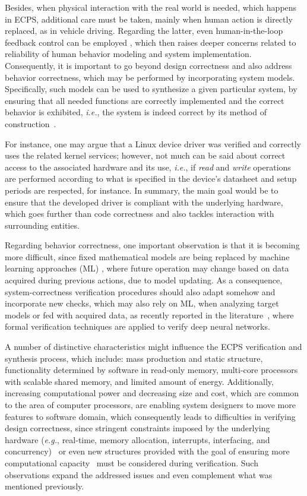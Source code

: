 \documentclass[format=acmsmall, review=false, screen=true]{acmart}
\begin{document}
Besides, when physical interaction with the real world is needed, which happens in ECPS, additional care must be taken, mainly when human action is directly replaced, as in vehicle driving. Regarding the latter, even human-in-the-loop feedback control can be employed \cite{munir}, which then raises deeper concerns related to reliability of human behavior modeling and system implementation. Consequently, it is important to go beyond design correctness and also address behavior correctness, which may be performed by incorporating system models. Specifically, such models can be used to synthesize a given particular system, by ensuring that all needed functions are correctly implemented and the correct behavior is exhibited, {\it i.e.}, the system is indeed correct by its method of construction~\cite{Abate17}.

For instance, one may argue that a Linux device driver \cite{ldd} was verified and correctly uses the related kernel services; however, not much can be said about correct access to the associated hardware and its use, {\it i.e.}, if \textit{read} and \textit{write} operations are performed according to what is specified in the device's datasheet and setup periods are respected, for instance. In summary, the main goal would be to ensure that the developed driver is compliant with the underlying hardware, which goes further than code correctness and also tackles interaction with surrounding entities.

Regarding behavior correctness, one important observation is that it is becoming more difficult, since fixed mathematical models are being replaced by machine learning approaches (ML) \cite{mlembe}, where future operation may change based on data acquired during previous actions, due to model updating. As a consequence, system-correctness verification procedures should also adapt somehow and incorporate new checks, which may also rely on ML, when analyzing target models or fed with acquired data, as recently reported in the literature~\cite{DBLP:conf/cav/HuangKWW17,DBLP:conf/cav/KatzBDJK17}, where formal verification techniques are applied to verify deep neural networks.

A number of distinctive characteristics might influence the ECPS verification and synthesis process, which include: mass production and static structure, functionality determined by software in read-only memory, multi-core processors with scalable shared memory, and limited amount of energy. Additionally, increasing computational power and decreasing size and cost, which are common to the area of computer processors, are enabling system designers to move more features to software domain, which consequently leads to difficulties in verifying design correctness, since stringent constraints imposed by the underlying hardware ({\it e.g.}, real-time, memory allocation, interrupts, interfacing, and concurrency)~\cite{Kroening15} or even new structures provided with the goal of ensuring more computational capacity~\cite{cudalucas} must be considered during verification. Such observations expand the addressed issues and even complement what was mentioned previously.
\end{document}
